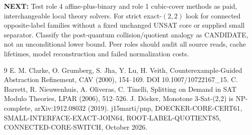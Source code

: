 \documentclass[11pt]{article}
\begin{document}
\noindent\textbf{NEXT:} Test role 4 affine-plus-binary and role 1 cubic-cover methods as paid, interchangeable local theory solvers. For strict exact-$(2,2)$ look for connected opposite-label families without a fixed unchanged UNSAT core or supplied small separator. Classify the post-quantum collision/quotient analogy as CANDIDATE, not an unconditional lower bound. Peer roles should audit all source reads, cache lifetimes, model reconstruction and failed normalization costs.

\begin{thebibliography}{9}
 E. M. Clarke, O. Grumberg, S. Jha, Y. Lu, H. Veith,
Counterexample-Guided Abstraction Refinement, CAV (2000), 154--169. DOI 10.1007/10722167\_15.
 C. Barrett, R. Nieuwenhuis, A. Oliveras, C. Tinelli,
Splitting on Demand in SAT Modulo Theories, LPAR (2006), 512--526.
 J. D\"ocker, Monotone 3-Sat-(2,2) is NP-complete, arXiv:1912.08032 (2019).
 j15marti/pnp, DOECKER-CORE-CERT61, SMALL-INTERFACE-EXACT-JOIN64,
ROOT-LABEL-QUOTIENT85, CONNECTED-CORE-SWITCH, October 2026.
\end{thebibliography}
\end{document}
